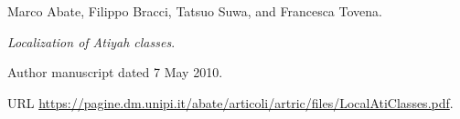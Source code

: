 Marco Abate, Filippo Bracci, Tatsuo Suwa, and Francesca Tovena.

\newblock \emph{Localization of Atiyah classes}.

\newblock Author manuscript dated 7 May 2010.

\newblock URL \url{https://pagine.dm.unipi.it/abate/articoli/artric/files/LocalAtiClasses.pdf}.
